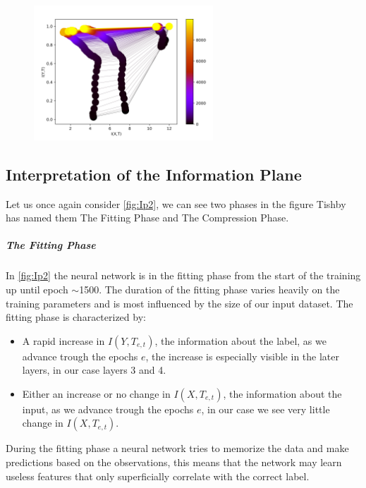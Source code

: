 \begin{figure}[H]
  \centering
  \includegraphics[width=0.60\textwidth]{figs/ip_10000.png}
  \label{fig:Ip2}
\end{figure}

\subsection{Interpretation of the Information Plane}

Let us once again consider \autoref{fig:Ip2}, we can see two phases in the figure
Tishby has named them The Fitting Phase and The Compression Phase.

\subparagraph{The Fitting Phase} In \autoref{fig:Ip2} the neural network is in
the fitting phase from the start of the training up until epoch $\sim$1500. The
duration of the fitting phase varies heavily on the training parameters and is
most influenced by the size of our input dataset. The fitting phase is
characterized by:
\begin{itemize}
  \item{
      A rapid increase in $I(Y, T_{e,t})$, the information about the label, as we
      advance trough the epochs $e$, the increase is especially visible in the
      later layers, in our case layers 3 and 4.
    }
  \item{
      Either an increase or no change in $I(X, T_{e,t})$, the information about
      the input, as we advance trough the epochs $e$, in our case we see very
      little change in $I(X,T_{e,t})$.
    }
\end{itemize}

During the fitting phase a neural network tries to memorize the data and make
predictions based on the observations, this means that the network may learn
useless features that only superficially correlate with the correct label.


